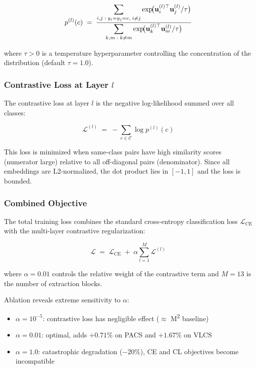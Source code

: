 \documentclass[12pt,a4paper]{article}
\begin{document}
\begin{equation}
  p^{(l)}(c) \;=\;
  \frac{%
    \displaystyle\sum_{\substack{i,j \;:\; y_i = y_j = c,\; i \neq j}}
    \exp\!\bigl(\mathbf{u}_i^{(l)\top} \mathbf{u}_j^{(l)} / \tau \bigr)
  }{%
    \displaystyle\sum_{\substack{k,m \;:\; k \neq m}}
    \exp\!\bigl(\mathbf{u}_k^{(l)\top} \mathbf{u}_m^{(l)} / \tau \bigr)
  }
  \label{eq:prob}
\end{equation}

where $\tau > 0$ is a temperature hyperparameter controlling the concentration of the
distribution (default $\tau{=}1.0$).

\subsubsection{Contrastive Loss at Layer $l$}

The contrastive loss at layer $l$ is the negative log-likelihood summed over all classes:

\begin{equation}
  \mathcal{L}^{(l)} \;=\; -\sum_{c \in \mathcal{C}} \log p^{(l)}(c)
  \label{eq:layer_loss}
\end{equation}

This loss is minimized when same-class pairs have high similarity scores (numerator large)
relative to all off-diagonal pairs (denominator). Since all embeddings are L2-normalized,
the dot product lies in $[-1, 1]$ and the loss is bounded.

\subsubsection{Combined Objective}

The total training loss combines the standard cross-entropy classification loss
$\mathcal{L}_{\text{CE}}$ with the multi-layer contrastive regularization:

\begin{equation}
  \boxed{
  \mathcal{L} \;=\; \mathcal{L}_{\text{CE}} \;+\; \alpha \sum_{l=1}^{M} \mathcal{L}^{(l)}
  }
  \label{eq:total}
\end{equation}

where $\alpha{=}0.01$ controls the relative weight of the contrastive term and
$M{=}13$ is the number of extraction blocks.

\begin{tcolorbox}[result={Key design choice: $\alpha$ sensitivity}]
  Ablation reveals extreme sensitivity to $\alpha$:
  \begin{itemize}
    \item $\alpha = 10^{-5}$: contrastive loss has negligible effect ($\approx$ M\textsuperscript{2} baseline)
    \item $\alpha = 0.01$: optimal, adds $+0.71\%$ on PACS and $+1.67\%$ on VLCS
    \item $\alpha = 1.0$: catastrophic degradation ($-20\%$), CE and CL objectives become incompatible
  \end{itemize}
\end{tcolorbox}
\end{document}
